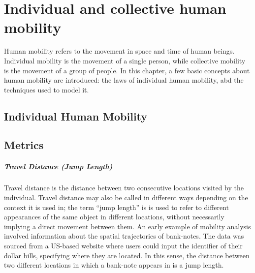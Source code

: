 \chapter{Individual and collective human mobility}

Human mobility refers to the movement in space and time of human beings. Individual mobility is the movement of a single person, while collective mobility is the movement of a group of people. In this chapter, a few basic concepts about human mobility are introduced: the laws of individual human mobility, abd the techniques used to model it.

\section{Individual Human Mobility}

\section{Metrics}

\paragraph{Travel Distance (Jump Length)}

Travel distance is the distance between two consecutive locations visited by the individual. Travel distance may also be called in different ways depending on the context it is used in; the term ``jump length'' is is used to refer to different appearances of the same object in different locations, without necessarily implying a direct movement between them. An early example of mobility analysis involved information about the spatial trajectories of bank-notes. The data was sourced from a US-based website where users could input the identifier of their dollar bills, specifying where they are located. In this sense, the distance between two different locations in which a bank-note appears in is a jump length.

